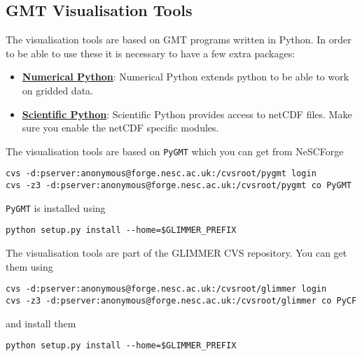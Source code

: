 \subsection{GMT Visualisation Tools}
The visualisation tools are based on GMT programs written in Python. In order to be able to use these it is necessary to have a few extra packages:
\begin{itemize}
\item \href{http://www.pfdubois.com/numpy/}{{\bf Numerical Python}}: Numerical Python extends python to be able to work on gridded data.
\item \href{http://starship.python.net/~hinsen/ScientificPython/}{{\bf Scientific Python}}: Scientific Python provides access to netCDF files. Make sure you enable the netCDF specific modules.
\end{itemize}

The visualisation tools are based on \texttt{PyGMT} which you can get from NeSCForge
{\small
\begin{verbatim}
cvs -d:pserver:anonymous@forge.nesc.ac.uk:/cvsroot/pygmt login
cvs -z3 -d:pserver:anonymous@forge.nesc.ac.uk:/cvsroot/pygmt co PyGMT
\end{verbatim}}
\texttt{PyGMT} is installed using
{\small
\begin{verbatim}
python setup.py install --home=$GLIMMER_PREFIX
\end{verbatim}}

The visualisation tools are part of the GLIMMER CVS repository. You can get them using
{\small
\begin{verbatim}
cvs -d:pserver:anonymous@forge.nesc.ac.uk:/cvsroot/glimmer login
cvs -z3 -d:pserver:anonymous@forge.nesc.ac.uk:/cvsroot/glimmer co PyCF
\end{verbatim}}
and install them
{\small
\begin{verbatim}
python setup.py install --home=$GLIMMER_PREFIX
\end{verbatim}}
